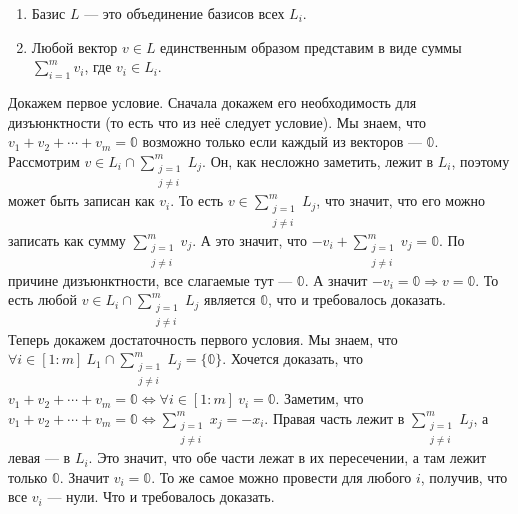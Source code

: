 \documentclass{article}
\begin{document}
\begin{itemize}
\begin{enumerate}
            \item Базис $L$ --- это объединение базисов всех $L_i$.
            \item Любой вектор $v\in L$ единственным образом представим в виде суммы $\sum\limits_{i=1}^m v_i$, где $v_i\in L_i$.
        \end{enumerate}
        \begin{Proof}
            Докажем первое условие. Сначала докажем его необходимость для дизъюнктности (то есть что из неё следует условие). Мы знаем, что $v_1+v_2+\cdots+v_m=\mathbb0$ возможно только если каждый из векторов --- $\mathbb0$. Рассмотрим $v\in L_i\cap\sum\limits_{\substack{j=1\\j\neq i}}^mL_j$. Он, как несложно заметить, лежит в $L_i$, поэтому может быть записан как $v_i$. То есть $v\in\sum\limits_{\substack{j=1\\j\neq i}}^mL_j$, что значит, что его можно записать как сумму $\sum\limits_{\substack{j=1\\j\neq i}}^mv_j$. А это значит, что $-v_i+\sum\limits_{\substack{j=1\\j\neq i}}^mv_j=\mathbb0$. По причине дизъюнктности, все слагаемые тут --- $\mathbb0$. А значит $-v_i=\mathbb0\Rightarrow v=\mathbb0$. То есть любой $v\in L_i\cap\sum\limits_{\substack{j=1\\j\neq i}}^mL_j$ является $\mathbb0$, что и требовалось доказать.\\
            Теперь докажем достаточность первого условия. Мы знаем, что $\forall i\in[1:m]~L_1\cap\sum\limits_{\substack{j=1\\j\neq i}}^mL_j=\{\mathbb0\}$. Хочется доказать, что $v_1+v_2+\cdots+v_m=\mathbb0\Leftrightarrow\forall i\in[1:m]~v_i=\mathbb0$. Заметим, что $v_1+v_2+\cdots+v_m=\mathbb0\Leftrightarrow\sum\limits_{\substack{j=1\\j\neq i}}^mx_j=-x_i$. Правая часть лежит в $\sum\limits_{\substack{j=1\\j\neq i}}^mL_j$, а левая --- в $L_i$. Это значит, что обе части лежат в их пересечении, а там лежит только $\mathbb0$. Значит $v_i=\mathbb0$. То же самое можно провести для любого $i$, получив, что все $v_i$ --- нули. Что и требовалось доказать.\\

\end{Proof}
\end{itemize}
\end{document}
